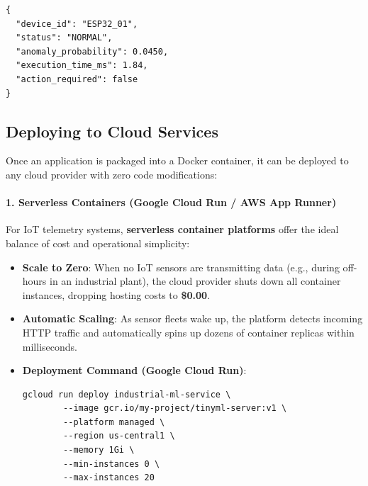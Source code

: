 \begin{lstlisting}[style=outputstyle, caption={HTTP JSON response returned from the containerized FastAPI server.}]
{
  "device_id": "ESP32_01",
  "status": "NORMAL",
  "anomaly_probability": 0.0450,
  "execution_time_ms": 1.84,
  "action_required": false
}
\end{lstlisting}

\subsection{Deploying to Cloud Services}\label{subsec:cloud_deployment}

Once an application is packaged into a Docker container, it can be deployed to any cloud provider with zero code modifications:

\paragraph{1. Serverless Containers (Google Cloud Run / AWS App Runner)}
For IoT telemetry systems, \textbf{serverless container platforms} offer the ideal balance of cost and operational simplicity:
\begin{itemize}
    \item \textbf{Scale to Zero}: When no IoT sensors are transmitting data (e.g., during off-hours in an industrial plant), the cloud provider shuts down all container instances, dropping hosting costs to \textbf{\$0.00}.
    \item \textbf{Automatic Scaling}: As sensor fleets wake up, the platform detects incoming HTTP traffic and automatically spins up dozens of container replicas within milliseconds.
    \item \textbf{Deployment Command (Google Cloud Run)}:
    \begin{lstlisting}[style=pythonstyle, numbers=none]
    gcloud run deploy industrial-ml-service \
        --image gcr.io/my-project/tinyml-server:v1 \
        --platform managed \
        --region us-central1 \
        --memory 1Gi \
        --min-instances 0 \
        --max-instances 20
    \end{lstlisting}
\end{itemize}

